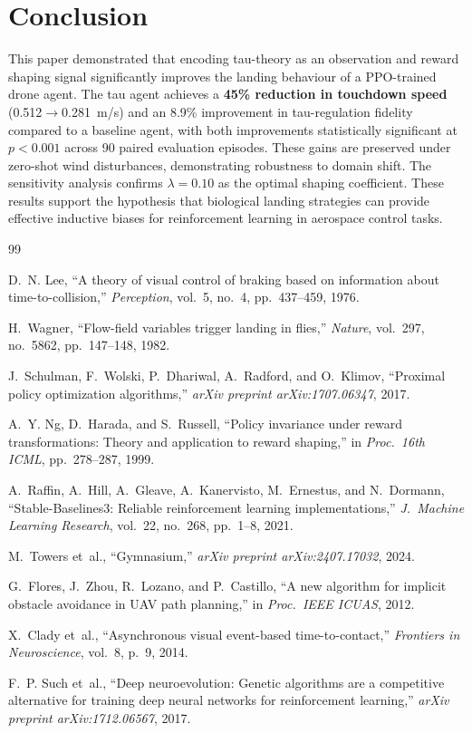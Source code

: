 \documentclass[10pt,twocolumn]{article}
\begin{document}
\section{Conclusion}
\label{sec:conclusion}

This paper demonstrated that encoding tau-theory as an observation and reward
shaping signal significantly improves the landing behaviour of a PPO-trained
drone agent.
The tau agent achieves a \textbf{45\% reduction in touchdown speed}
(0.512$\rightarrow$0.281~m/s) and an 8.9\% improvement in tau-regulation
fidelity compared to a baseline agent, with both improvements statistically
significant at $p<0.001$ across 90 paired evaluation episodes.
These gains are preserved under zero-shot wind disturbances, demonstrating
robustness to domain shift.
The sensitivity analysis confirms $\lambda=0.10$ as the optimal shaping
coefficient.
These results support the hypothesis that biological landing strategies can
provide effective inductive biases for reinforcement learning in aerospace
control tasks.

\begin{thebibliography}{99}

D.~N. Lee, ``A theory of visual control of braking based on information about
time-to-collision,'' \emph{Perception}, vol.~5, no.~4, pp.~437--459, 1976.

H.~Wagner, ``Flow-field variables trigger landing in flies,''
\emph{Nature}, vol.~297, no.~5862, pp.~147--148, 1982.

J.~Schulman, F.~Wolski, P.~Dhariwal, A.~Radford, and O.~Klimov,
``Proximal policy optimization algorithms,''
\emph{arXiv preprint arXiv:1707.06347}, 2017.

A.~Y. Ng, D.~Harada, and S.~Russell,
``Policy invariance under reward transformations: Theory and application to
reward shaping,'' in \emph{Proc.\ 16th ICML}, pp.~278--287, 1999.

A.~Raffin, A.~Hill, A.~Gleave, A.~Kanervisto, M.~Ernestus, and N.~Dormann,
``Stable-Baselines3: Reliable reinforcement learning implementations,''
\emph{J.\ Machine Learning Research}, vol.~22, no.~268, pp.~1--8, 2021.

M.~Towers et~al., ``Gymnasium,''
\emph{arXiv preprint arXiv:2407.17032}, 2024.

G.~Flores, J.~Zhou, R.~Lozano, and P.~Castillo,
``A new algorithm for implicit obstacle avoidance in UAV path planning,''
in \emph{Proc.\ IEEE ICUAS}, 2012.

X.~Clady et~al.,
``Asynchronous visual event-based time-to-contact,''
\emph{Frontiers in Neuroscience}, vol.~8, p.~9, 2014.

F.~P. Such et~al.,
``Deep neuroevolution: Genetic algorithms are a competitive alternative for
training deep neural networks for reinforcement learning,''
\emph{arXiv preprint arXiv:1712.06567}, 2017.

\end{thebibliography}
\end{document}
